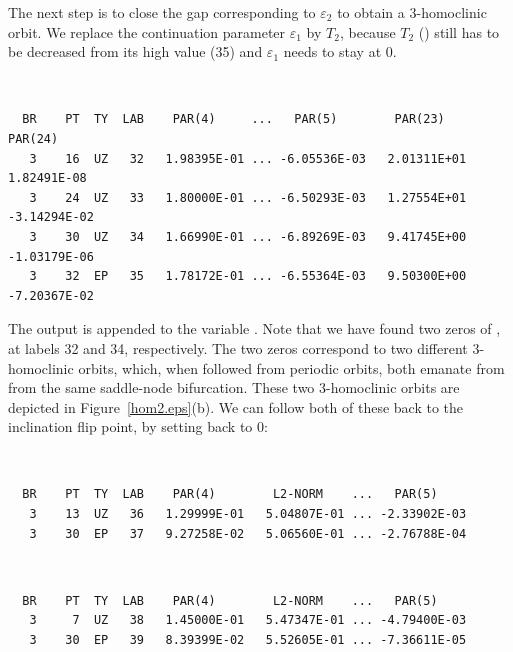 \documentclass[12pt]{report}
\begin{document}
The next step is to close the gap corresponding to $\varepsilon_2$ to
obtain a 3-homoclinic orbit. We replace the continuation parameter
$\varepsilon_1$ by $T_2$, because $T_2$ ()
still has to be decreased from
its high value (35) and $\varepsilon_1$ needs to stay at 0.
\begin{center}
\\
\end{center} 
\begin{verbatim}
  BR    PT  TY  LAB    PAR(4)     ...   PAR(5)        PAR(23)       PAR(24)
   3    16  UZ   32   1.98395E-01 ... -6.05536E-03   2.01311E+01   1.82491E-08
   3    24  UZ   33   1.80000E-01 ... -6.50293E-03   1.27554E+01  -3.14294E-02
   3    30  UZ   34   1.66990E-01 ... -6.89269E-03   9.41745E+00  -1.03179E-06
   3    32  EP   35   1.78172E-01 ... -6.55364E-03   9.50300E+00  -7.20367E-02
\end{verbatim}
The output is appended to the \python variable .
Note that we have found two zeros of , at labels 32 and
34, respectively. The two zeros
correspond to two different 3-homoclinic
orbits, which, when followed from periodic orbits, both emanate from
from the same saddle-node bifurcation.
These two 3-homoclinic orbits are depicted in Figure~\ref{hom2.eps}(b).
We can follow both of these back to the inclination flip point, by
setting  back to 0:
\begin{center}
\\
\end{center} 
\begin{verbatim}
  BR    PT  TY  LAB    PAR(4)        L2-NORM    ...   PAR(5)     
   3    13  UZ   36   1.29999E-01   5.04807E-01 ... -2.33902E-03
   3    30  EP   37   9.27258E-02   5.06560E-01 ... -2.76788E-04
\end{verbatim}
\begin{center}
 \\
\end{center}
\begin{verbatim}
  BR    PT  TY  LAB    PAR(4)        L2-NORM    ...   PAR(5)     
   3     7  UZ   38   1.45000E-01   5.47347E-01 ... -4.79400E-03
   3    30  EP   39   8.39399E-02   5.52605E-01 ... -7.36611E-05
\end{verbatim}
\end{document}
